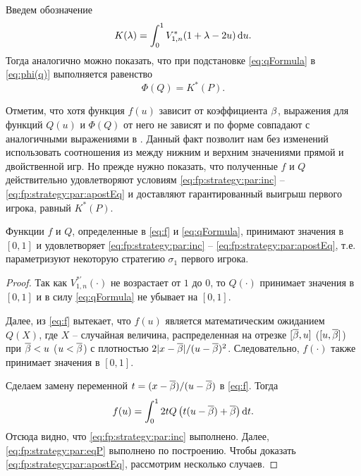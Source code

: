 {Введем обозначение
\begin{equation*}
  K(\lambda) = \int_0^1 V^*_{1,n}(1+\lambda-2u) \mathop{}\!\mathrm{d} u.
\end{equation*}
Тогда аналогично \cite{demeyer02} можно показать, что при подстановке \eqref{eq:qFormula} в \eqref{eq:phi(q)} выполняется равенство
\begin{equation}\label{eq:phi=k*}
  \Phi(Q) = K^*(P).
\end{equation}

Отметим, что хотя функция $f(u)$ зависит от коэффициента $\beta$, выражения для функций $Q(u)$ и $\Phi(Q)$ от него не зависят и по форме совпадают с аналогичными выражениями в \cite{demeyer02}.
Данный факт позволит нам без изменений использовать соотношения из \cite{demeyer02} между нижним и верхним значениями прямой и двойственной игр.
Но прежде нужно показать, что полученные $f$ и $Q$ действительно удовлетворяют условиям \eqref{eq:fp:strategy:par:inc} -- \eqref{eq:fp:strategy:par:apostEq} и доставляют гарантированный выигрыш первого игрока, равный $K^*(P)$.

\begin{lemma}
  \label{lemma:fp:fQ:isStrategy}
  Функции $f$ и $Q$\textnormal{,} определенные в \eqref{eq:f} и \eqref{eq:qFormula}\textnormal{,} принимают значения в $[0, 1]$ и удовлетворяет \eqref{eq:fp:strategy:par:inc} -- \eqref{eq:fp:strategy:par:apostEq}\textnormal{,} т.е. параметризуют некоторую стратегию $\sigma_1$ первого игрока.
\end{lemma}
\begin{proof}
  Так как $V^{*\prime}_{1,n}(\cdot)$ не возрастает от $1$ до $0$, то
  $Q(\cdot)$ принимает значения в $[0, 1]$ и в силу \eqref{eq:qFormula} не убывает на $[0, 1]$.

  Далее, из \eqref{eq:f} вытекает, что $f(u)$ является математическим ожиданием $Q(X)$,
  где $X$ -- случайная величина, распределенная на отрезке $[{\overline{\beta}}, u]$ ($[u, {\overline{\beta}}]$) при ${\overline{\beta}} < u$ ($u < {\overline{\beta}}$) с плотностью
  $2|x-{\overline{\beta}}|/(u-{\overline{\beta}})^2$. Следовательно, $f(\cdot)$ также принимает значения
  в $[0, 1]$.

  Сделаем замену переменной $t = (x - {\overline{\beta}})/(u - {\overline{\beta}})$  в \eqref{eq:f}.
  Тогда
  \begin{equation*}
    f(u) = \int_0^1 2 t Q \left( t(u - {\overline{\beta}}) + {\overline{\beta}} \right) \mathop{}\!\mathrm{d} t.
  \end{equation*}
  Отсюда видно, что \eqref{eq:fp:strategy:par:inc} выполнено.
  Далее, \eqref{eq:fp:strategy:par:eqP} выполнено по построению.
  Чтобы доказать \eqref{eq:fp:strategy:par:apostEq}, рассмотрим несколько случаев.


\end{proof}}
